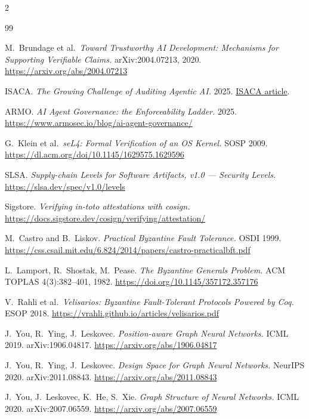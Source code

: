 \documentclass[11pt,letterpaper]{article}
\theoremstyle{definition}
\begin{document}
\FloatBarrier
\footnotesize
\begin{multicols}{2}
\begin{thebibliography}{99}

 M.\ Brundage et al.\ \emph{Toward Trustworthy AI
Development: Mechanisms for Supporting Verifiable Claims.} arXiv:2004.07213, 2020.
\url{https://arxiv.org/abs/2004.07213}

 ISACA. \emph{The Growing Challenge of Auditing Agentic AI.}
2025. \href{https://www.isaca.org/resources/news-and-trends/industry-news/2025/the-growing-challenge-of-auditing-agentic-ai}{ISACA article}.

 ARMO. \emph{AI Agent Governance: the Enforceability Ladder.}
2025. \url{https://www.armosec.io/blog/ai-agent-governance/}

 G.\ Klein et al.\ \emph{seL4: Formal Verification of an OS
Kernel.} SOSP 2009. \url{https://dl.acm.org/doi/10.1145/1629575.1629596}

 SLSA. \emph{Supply-chain Levels for Software Artifacts, v1.0 ---
Security Levels.} \url{https://slsa.dev/spec/v1.0/levels}

 Sigstore. \emph{Verifying in-toto attestations with cosign.}
\url{https://docs.sigstore.dev/cosign/verifying/attestation/}

 M.\ Castro and B.\ Liskov. \emph{Practical Byzantine Fault
Tolerance.} OSDI 1999.
\url{https://css.csail.mit.edu/6.824/2014/papers/castro-practicalbft.pdf}

 L.\ Lamport, R.\ Shostak, M.\ Pease. \emph{The Byzantine
Generals Problem.} ACM TOPLAS 4(3):382--401, 1982.
\url{https://doi.org/10.1145/357172.357176}

 V.\ Rahli et al.\ \emph{Velisarios: Byzantine
Fault-Tolerant Protocols Powered by Coq.} ESOP 2018.
\url{https://vrahli.github.io/articles/velisarios.pdf}

 J.\ You, R.\ Ying, J.\ Leskovec. \emph{Position-aware
Graph Neural Networks.} ICML 2019. arXiv:1906.04817.
\url{https://arxiv.org/abs/1906.04817}

 J.\ You, R.\ Ying, J.\ Leskovec. \emph{Design Space
for Graph Neural Networks.} NeurIPS 2020. arXiv:2011.08843.
\url{https://arxiv.org/abs/2011.08843}

 J.\ You, J.\ Leskovec, K.\ He, S.\ Xie. \emph{Graph
Structure of Neural Networks.} ICML 2020. arXiv:2007.06559.
\url{https://arxiv.org/abs/2007.06559}


\end{thebibliography}
\end{multicols}
\end{document}

